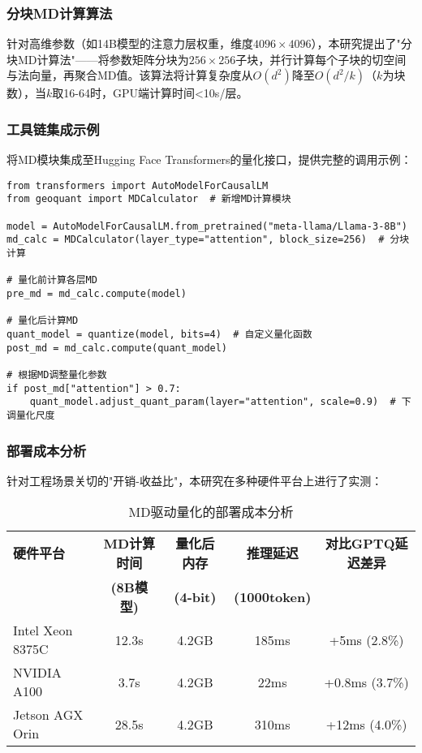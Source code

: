 \subsubsection{分块MD计算算法}

针对高维参数（如14B模型的注意力层权重，维度$4096 \times 4096$），本研究提出了"分块MD计算法"——将参数矩阵分块为$256 \times 256$子块，并行计算每个子块的切空间与法向量，再聚合MD值。该算法将计算复杂度从$O(d^2)$降至$O(d^2/k)$（$k$为块数），当$k$取16-64时，GPU端计算时间<10s/层。

\subsubsection{工具链集成示例}

将MD模块集成至Hugging Face Transformers的量化接口，提供完整的调用示例：

\begin{verbatim}
from transformers import AutoModelForCausalLM
from geoquant import MDCalculator  # 新增MD计算模块

model = AutoModelForCausalLM.from_pretrained("meta-llama/Llama-3-8B")
md_calc = MDCalculator(layer_type="attention", block_size=256)  # 分块计算

# 量化前计算各层MD
pre_md = md_calc.compute(model)

# 量化后计算MD
quant_model = quantize(model, bits=4)  # 自定义量化函数
post_md = md_calc.compute(quant_model)

# 根据MD调整量化参数
if post_md["attention"] > 0.7:
    quant_model.adjust_quant_param(layer="attention", scale=0.9)  # 下调量化尺度
\end{verbatim}

\subsubsection{部署成本分析}

针对工程场景关切的"开销-收益比"，本研究在多种硬件平台上进行了实测：

\begin{table}[h]
\centering
\caption{MD驱动量化的部署成本分析}
\begin{tabular}{|l|c|c|c|c|}
\hline
\textbf{硬件平台} & \textbf{MD计算时间} & \textbf{量化后内存} & \textbf{推理延迟} & \textbf{对比GPTQ延迟差异} \\
& \textbf{(8B模型)} & \textbf{(4-bit)} & \textbf{(1000token)} & \\
\hline
Intel Xeon 8375C & 12.3s & 4.2GB & 185ms & +5ms (2.8\%) \\
NVIDIA A100 & 3.7s & 4.2GB & 22ms & +0.8ms (3.7\%) \\
Jetson AGX Orin & 28.5s & 4.2GB & 310ms & +12ms (4.0\%) \\
\hline
\end{tabular}
\end{table}

